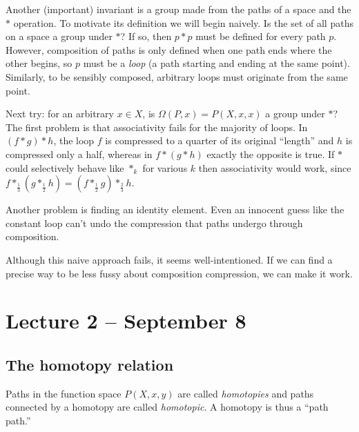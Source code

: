 \documentclass[letterpaper]{article}
\begin{document}
Another (important) invariant is a group made from the paths of a space and the $\ast$ operation. To motivate its definition we will begin naively. Is the set of all paths on a space a group under $\ast$? If so, then $p \ast p$ must be defined for every path $p$. However, composition of paths is only defined when one path ends where the other begins, so $p$ must be a \emph{loop} (a path starting and ending at the same point). Similarly, to be sensibly composed, arbitrary loops must originate from the same point.

Next try: for an arbitrary $x \in X$, is $\Omega(P, x) = P(X, x, x)$ a group under $\ast$? The first problem is that associativity fails for the majority of loops. In $(f \ast g) \ast h$, the loop $f$ is compressed to a quarter of its original ``length'' and $h$ is compressed only a half, whereas in $f \ast (g \ast h)$ exactly the opposite is true. If $\ast$ could selectively behave like $\ast_k$ for various $k$ then associativity would work, since $f \ast_\frac{1}{3} (g \ast_\frac{1}{2} h) = (f \ast_\frac{1}{2} g) \ast_\frac{2}{3} h$.

Another problem is finding an identity element. Even an innocent guess like the constant loop can't undo the compression that paths undergo through composition.

Although this naive approach fails, it seems well-intentioned. If we can find a precise way to be less fussy about composition compression, we can make it work.

\section{Lecture 2 -- September 8}

\subsection{The homotopy relation}

Paths in the function space $P(X, x, y)$ are called \emph{homotopies} and paths connected by a homotopy are called \emph{homotopic}. A homotopy is thus a ``path path.''
\end{document}
